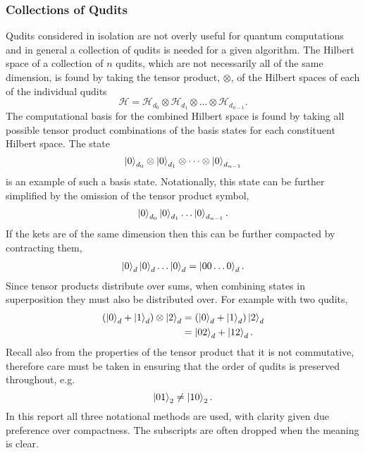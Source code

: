 \subsubsection{Collections of Qudits}
\label{subsubsection:collections_qbits}
Qudits considered in isolation are not overly useful for quantum computations and in general a collection of qudits is needed for a given algorithm.
The Hilbert space of a collection of $n$ qudits, which are not necessarily all of the same dimension, is found by taking the tensor product, $\otimes$, of the Hilbert spaces of each of the individual qudits
\begin{equation}
    \mathcal{H} = \mathcal{H}_{d_0} \otimes \mathcal{H}_{d_1} \otimes \dots \otimes \mathcal{H}_{d_{n-1}}.
\end{equation}
The computational basis for the combined Hilbert space is found by taking all possible tensor product combinations of the basis states for each constituent Hilbert space.
The state 
\begin{equation}
    \ket{0}_{d_0}\otimes\ket{0}_{d_1}\otimes\dots\otimes\ket{0}_{d_{n-1}}
\end{equation}
is an example of such a basis state.
Notationally, this state can be further simplified by the omission of the tensor product symbol,
\begin{equation}
    \ket{0}_{d_0}\ket{0}_{d_1}\dots\ket{0}_{d_{n-1}}.
\end{equation}
If the kets are of the same dimension then this can be further compacted by contracting them,
\begin{align}
    \ket{0}_{d}\ket{0}_{d}\dots\ket{0}_{d} = \ket{00\dots0}_d.
\end{align}
Since tensor products distribute over sums, when combining states in superposition they must also be distributed over.
For example with two qudits,
\begin{align}
    (\ket{0}_d + \ket{1}_d)\otimes\ket{2}_d &= (\ket{0}_d + \ket{1}_d)\ket{2}_d\\
    &= \ket{02}_d + \ket{12}_d.
\end{align}
Recall also from the properties of the tensor product that it is not commutative, therefore care must be taken in ensuring that the order of qudits is preserved throughout, e.g.
\begin{equation}
    \ket{01}_2 \neq \ket{10}_2.
\end{equation}
In this report all three notational methods are used, with clarity given due preference over compactness.
The subscripts are often dropped when the meaning is clear.

